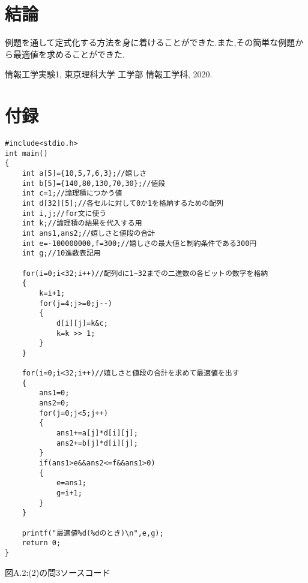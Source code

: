 \documentclass[12pt]{jarticle}
\begin{document}
\section{結論}
例題を通して定式化する方法を身に着けることができた.また,その簡単な例題から最適値を求めることができた.
\begin{thebibliography}{99}
	\label{sannkoubunnkenn_chapter}
	情報工学実験1,
	東京理科大学 工学部 情報工学科, 2020. 
\end{thebibliography}
\clearpage
\appendix
\section{付録}
\begin{framed}
	\begin{verbatim}
#include<stdio.h>
int main()
{
	int a[5]={10,5,7,6,3};//嬉しさ
	int b[5]={140,80,130,70,30};//値段
	int c=1;//論理積につかう値
	int d[32][5];//各セルに対して0か1を格納するための配列
	int i,j;//for文に使う
	int k;//論理積の結果を代入する用
	int ans1,ans2;//嬉しさと値段の合計
	int e=-100000000,f=300;//嬉しさの最大値と制約条件である300円
	int g;//10進数表記用
			
	for(i=0;i<32;i++)//配列dに1~32までの二進数の各ビットの数字を格納
	{
		k=i+1;
		for(j=4;j>=0;j--)
		{
			d[i][j]=k&c;
			k=k >> 1;
		}
	}
			
	for(i=0;i<32;i++)//嬉しさと値段の合計を求めて最適値を出す
	{
		ans1=0;
		ans2=0;
		for(j=0;j<5;j++)
		{
 			ans1+=a[j]*d[i][j];
			ans2+=b[j]*d[i][j];
		}
		if(ans1>e&&ans2<=f&&ans1>0)
		{
			e=ans1;
			g=i+1;
		}
	}
			
	printf("最適値%d(%dのとき)\n",e,g);
	return 0;
}
    \end{verbatim}
\end{framed}
\begin{center}
	図A.2:(2)の問3ソースコード
\end{center}
\end{document}
